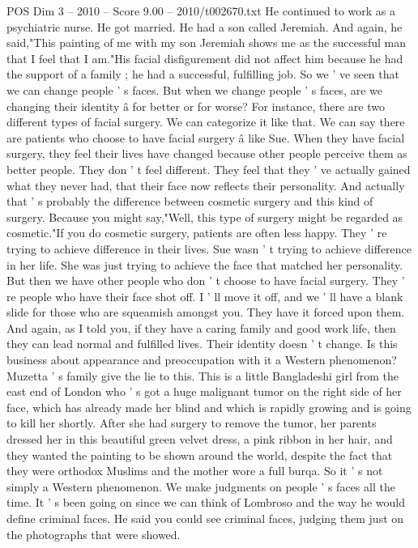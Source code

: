 \begin{textsample}{POS Dim 3 – 2010 – Score 9.00 – 2010/t002670.txt}
He continued to work as a psychiatric nurse.
He got married.
He had a son called Jeremiah.
And again, he said,"This painting of me with my son Jeremiah shows me as the successful man that I feel that I am."His facial disfigurement did not affect him because he had the support of a family ; he had a successful, fulfilling job.
So we ' ve seen that we can change people ' s faces.
But when we change people ' s faces, are we changing their identity â for better or for worse?
For instance, there are two different types of facial surgery.
We can categorize it like that.
We can say there are patients who choose to have facial surgery â like Sue.
When they have facial surgery, they feel their lives have changed because other people perceive them as better people.
They don ' t feel different.
They feel that they ' ve actually gained what they never had, that their face now reflects their personality.
And actually that ' s probably the difference between cosmetic surgery and this kind of surgery.
Because you might say,"Well, this type of surgery might be regarded as cosmetic."If you do cosmetic surgery, patients are often less happy.
They ' re trying to achieve difference in their lives.
Sue wasn ' t trying to achieve difference in her life.
She was just trying to achieve the face that matched her personality.
But then we have other people who don ' t choose to have facial surgery.
They ' re people who have their face shot off.
I ' ll move it off, and we ' ll have a blank slide for those who are squeamish amongst you.
They have it forced upon them.
And again, as I told you, if they have a caring family and good work life, then they can lead normal and fulfilled lives.
Their identity doesn ' t change.
Is this business about appearance and preoccupation with it a Western phenomenon?
Muzetta ' s family give the lie to this.
This is a little Bangladeshi girl from the east end of London who ' s got a huge malignant tumor on the right side of her face, which has already made her blind and which is rapidly growing and is going to kill her shortly.
After she had surgery to remove the tumor, her parents dressed her in this beautiful green velvet dress, a pink ribbon in her hair, and they wanted the painting to be shown around the world, despite the fact that they were orthodox Muslims and the mother wore a full burqa.
So it ' s not simply a Western phenomenon.
We make judgments on people ' s faces all the time.
It ' s been going on since we can think of Lombroso and the way he would define criminal faces.
He said you could see criminal faces, judging them just on the photographs that were showed.

\end{textsample}
